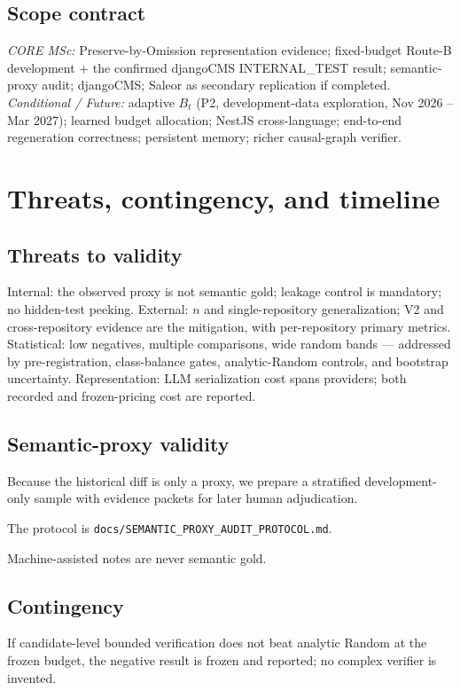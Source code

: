 \documentclass[11pt,a4paper]{article}
\begin{document}
\subsection{Scope contract}
\emph{CORE MSc:} Preserve-by-Omission representation evidence; fixed-budget
Route-B development + the confirmed djangoCMS INTERNAL\_TEST result;
semantic-proxy audit; djangoCMS; Saleor as secondary replication if completed.
\emph{Conditional / Future:} adaptive $B_t$ (P2, development-data exploration,
Nov 2026 -- Mar 2027); learned budget allocation; NestJS cross-language;
end-to-end regeneration correctness; persistent memory; richer causal-graph
verifier.

\section{Threats, contingency, and timeline}
\label{sec:threats}

\subsection{Threats to validity}
Internal: the observed proxy is not semantic gold; leakage control is mandatory;
no hidden-test peeking. External: $n$ and single-repository generalization; V2
and cross-repository evidence are the mitigation, with per-repository primary
metrics. Statistical: low negatives, multiple comparisons, wide random bands ---
addressed by pre-registration, class-balance gates, analytic-Random controls,
and bootstrap uncertainty. Representation: LLM serialization cost spans
providers; both recorded and frozen-pricing cost are reported.

\subsection{Semantic-proxy validity}
Because the historical diff is only a proxy, we prepare a stratified
development-only sample with evidence packets for later human adjudication.
\begin{sloppypar}
The protocol is
\texttt{docs/SEMANTIC\_PROXY\_AUDIT\_PROTOCOL.md}.
\end{sloppypar}
Machine-assisted notes are never semantic gold.

\subsection{Contingency}
If candidate-level bounded verification does not beat analytic Random at the
frozen budget, the negative result is frozen and reported; no complex verifier
is invented.
\end{document}
